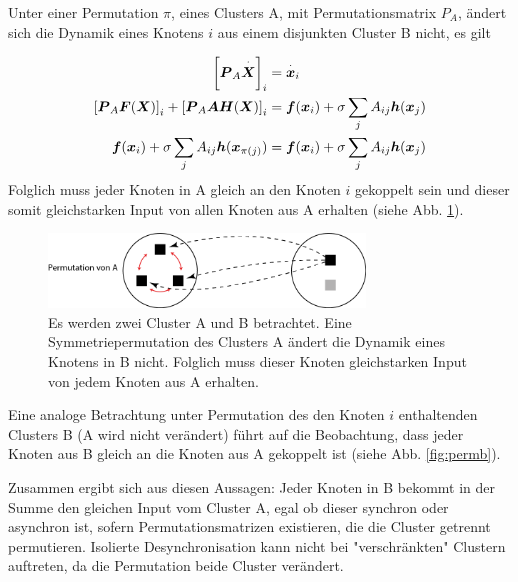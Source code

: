 Unter einer Permutation $\pi$, eines Clusters A, mit Permutationsmatrix $P_A$, ändert sich die Dynamik eines Knotens $i$ aus einem disjunkten Cluster B nicht, es gilt



\begin{align}
		\notag \left[\boldsymbol{P}_A	\overset{\cdot}{\boldsymbol{X}}\right]_i&= \overset{\cdot}{\boldsymbol{x}}_i\\
		\notag\left[\boldsymbol{P}_A \boldsymbol{F}(\boldsymbol{X})\right]_i+
			\left[\boldsymbol{P}_A\boldsymbol{A}\boldsymbol{H}(\boldsymbol{X})\right]_i&=
			\boldsymbol{f}(\boldsymbol{x}_i)+
			\sigma\sum_j A_{ij}\boldsymbol{h}(\boldsymbol{x}_j)\\
		\boldsymbol{f}(\boldsymbol{x}_i)+
			\sigma\sum_j A_{ij}\boldsymbol{h}(\boldsymbol{x}_{\pi\left(j\right)})&=
		\boldsymbol{f}(\boldsymbol{x}_i)+
			\sigma\sum_j A_{ij}\boldsymbol{h}(\boldsymbol{x}_j)		
\end{align}
Folglich muss jeder Knoten in A gleich an den Knoten $i$ gekoppelt sein und dieser somit gleichstarken Input von allen Knoten aus A erhalten (siehe Abb. \ref{fig:perma}).

\begin{figure}
		\includegraphics[width=0.75\textwidth]{abb/misc/perm_a.png}
		\caption{Es werden zwei Cluster A und B betrachtet. Eine Symmetriepermutation des Clusters A ändert die Dynamik eines Knotens in B nicht. Folglich muss dieser Knoten gleichstarken Input von jedem Knoten aus A erhalten.}
		\label{fig:perma}
\end{figure}


Eine analoge Betrachtung  unter Permutation des den Knoten $i$ enthaltenden Clusters B (A wird nicht verändert) führt auf die Beobachtung, dass jeder Knoten aus B gleich an die Knoten aus A gekoppelt ist (siehe Abb. \ref{fig:permb}). 

Zusammen ergibt sich aus diesen Aussagen: Jeder Knoten in B bekommt in der Summe den gleichen Input vom Cluster A, egal ob dieser synchron oder asynchron ist, sofern Permutationsmatrizen existieren, die die Cluster getrennt permutieren. Isolierte Desynchronisation kann nicht bei "verschränkten" Clustern auftreten, da die Permutation beide Cluster verändert.

